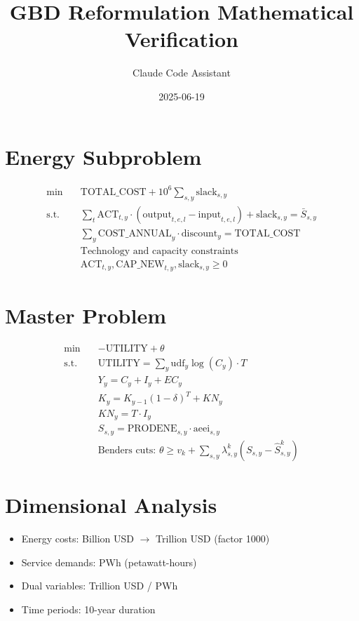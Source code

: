 \documentclass{article}
\title{GBD Reformulation Mathematical Verification}
\author{Claude Code Assistant}
\date{2025-06-19}
\begin{document}
\maketitle

\section{Energy Subproblem}
\begin{align}
\min \quad & \text{TOTAL\_COST} + 10^6 \sum_{s,y} \text{slack}_{s,y} \\
\text{s.t.} \quad & \sum_t \text{ACT}_{t,y} \cdot (\text{output}_{t,e,l} - \text{input}_{t,e,l}) + \text{slack}_{s,y} = \bar{S}_{s,y} \\
& \sum_y \text{COST\_ANNUAL}_y \cdot \text{discount}_y = \text{TOTAL\_COST} \\
& \text{Technology and capacity constraints} \\
& \text{ACT}_{t,y}, \text{CAP\_NEW}_{t,y}, \text{slack}_{s,y} \geq 0
\end{align}

\section{Master Problem}
\begin{align}
\min \quad & -\text{UTILITY} + \theta \\
\text{s.t.} \quad & \text{UTILITY} = \sum_y \text{udf}_y \log(C_y) \cdot T \\
& Y_y = C_y + I_y + EC_y \\
& K_y = K_{y-1}(1-\delta)^T + KN_y \\
& KN_y = T \cdot I_y \\
& S_{s,y} = \text{PRODENE}_{s,y} \cdot \text{aeei}_{s,y} \\
& \text{Benders cuts: } \theta \geq v_k + \sum_{s,y} \lambda_{s,y}^k (S_{s,y} - \hat{S}_{s,y}^k)
\end{align}

\section{Dimensional Analysis}
\begin{itemize}
\item Energy costs: Billion USD $\rightarrow$ Trillion USD (factor 1000)
\item Service demands: PWh (petawatt-hours)
\item Dual variables: Trillion USD / PWh
\item Time periods: 10-year duration
\end{itemize}
\end{document}
